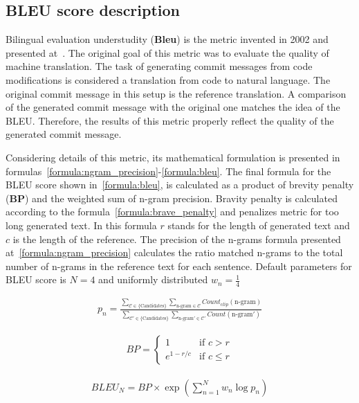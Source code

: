 \subsection{BLEU score description}\label{subsec:bleu}
Bilingual evaluation understudity (\textbf{Bleu}) is the metric invented in 2002 and presented at~\cite{papineni2002bleu}. The original goal of this metric was to evaluate the quality of machine translation. The task of generating commit messages from code modifications is considered a translation from code to natural language. The original commit message in this setup is the reference translation. A comparison of the generated commit message with the original one matches the idea of the BLEU\@. Therefore, the results of this metric properly reflect the quality of the generated commit message. 

Considering details of this metric, its mathematical formulation is presented in formulas~\ref{formula:ngram_precision}-\ref{formula:bleu}. The final formula for the BLEU score shown in~\ref{formula:bleu}, is calculated as a product of brevity penalty (\textbf{BP}) and the weighted sum of n-gram precision. Bravity penalty is calculated according to the formula~\ref{formula:brave_penalty} and penalizes metric for too long generated text. In this formula $r$ stands for the length of generated text and $c$ is the length of the reference. The precision of the n-grams formula presented at~\ref{formula:ngram_precision} calculates the ratio matched n-grams to the total number of n-grams in the reference text for each sentence. Default parameters for BLEU score is $N=4$ and uniformly distributed $w_n = \frac{1}{4}$

\begin{align}\label{formula:ngram_precision}
    p_n = \frac{\sum_{\mathcal{C} \in \text{\{Candidates\}}} \sum_{\text{n-gram} \in \mathcal{C}} Count_{clip}(\text{n-gram})}
    {\sum_{\mathcal{C}' \in \text{\{Candidates\}}} \sum_{\text{n-gram}' \in \mathcal{C}'} Count(\text{n-gram}')}
\end{align}

\begin{align}\label{formula:brave_penalty}
    BP = \begin{cases}
        1 & \text{if } c > r \\ 
        e^{1 - r/c} & \text{if } c \leq r
    \end{cases}
\end{align}

\begin{align}\label{formula:bleu}
    BLEU_N = BP \times \exp{\left( \sum_{n=1}^{N} w_n \log p_n\right)}
\end{align}

